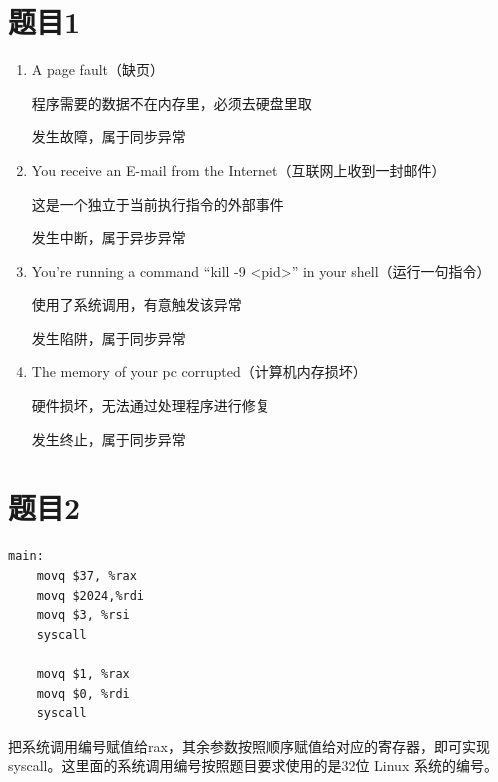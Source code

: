 \documentclass[fleqn]{ctexart}
\begin{document}
\section*{题目1}
\begin{enumerate}[label=(\arabic*),leftmargin=0pt,itemindent=2em]
    \item A page fault（缺页）
    
    程序需要的数据不在内存里，必须去硬盘里取

    发生故障，属于同步异常
    \item You receive an E-mail from the Internet（互联网上收到一封邮件）
    
    这是一个独立于当前执行指令的外部事件
    
    发生中断，属于异步异常
    \item You’re running a command “kill -9 <pid>” in your shell（运行一句指令）
    
    使用了系统调用，有意触发该异常
    
    发生陷阱，属于同步异常
    \item The memory of your pc corrupted（计算机内存损坏）
    
    硬件损坏，无法通过处理程序进行修复
    
    发生终止，属于同步异常
\end{enumerate}

\section*{题目2}
\begin{verbatim}
main:
    movq $37, %rax
    movq $2024,%rdi
    movq $3, %rsi
    syscall

    movq $1, %rax
    movq $0, %rdi
    syscall
\end{verbatim}
把系统调用编号赋值给rax，其余参数按照顺序赋值给对应的寄存器，即可实现syscall。这里面的系统调用编号按照题目要求使用的是32位 Linux 系统的编号。
\end{document}
